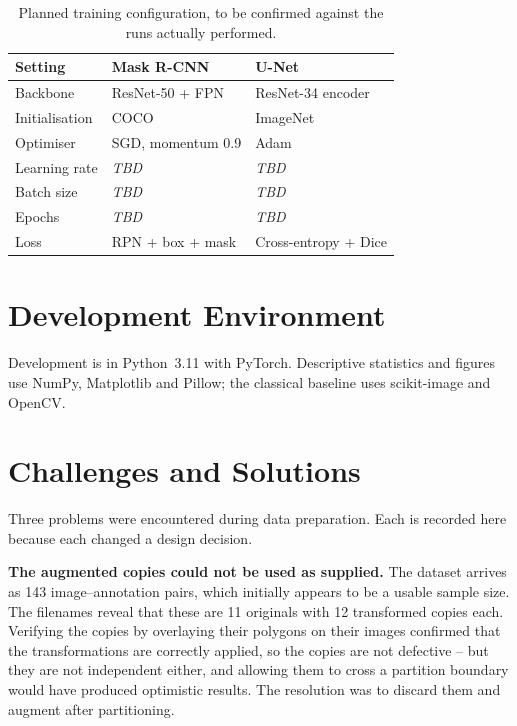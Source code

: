 \begin{table}[htbp]
    \centering
    \caption{Planned training configuration, to be confirmed against the runs
    actually performed.}
    \label{tab:training_config}
    \begin{tabular}{lll}
        \toprule
        Setting & Mask R-CNN & U-Net \\
        \midrule
        Backbone        & ResNet-50 + FPN   & ResNet-34 encoder \\
        Initialisation  & COCO              & ImageNet \\
        Optimiser       & SGD, momentum 0.9 & Adam \cite{kingma2015adam} \\
        Learning rate   & \textit{TBD}      & \textit{TBD} \\
        Batch size      & \textit{TBD}      & \textit{TBD} \\
        Epochs          & \textit{TBD}      & \textit{TBD} \\
        Loss            & RPN + box + mask  & Cross-entropy + Dice \\
        \bottomrule
    \end{tabular}
\end{table}

\section{Development Environment}

Development is in Python~3.11 with PyTorch. Descriptive statistics and figures use
NumPy, Matplotlib and Pillow; the classical baseline uses scikit-image and OpenCV.

\section{Challenges and Solutions}

Three problems were encountered during data preparation. Each is recorded here
because each changed a design decision.

\textbf{The augmented copies could not be used as supplied.} The dataset arrives as
143 image--annotation pairs, which initially appears to be a usable sample size. The
filenames reveal that these are 11 originals with 12 transformed copies each.
Verifying the copies by overlaying their polygons on their images confirmed that the
transformations are correctly applied, so the copies are not defective -- but they
are not independent either, and allowing them to cross a partition boundary would
have produced optimistic results. The resolution was to discard them and augment
after partitioning.

